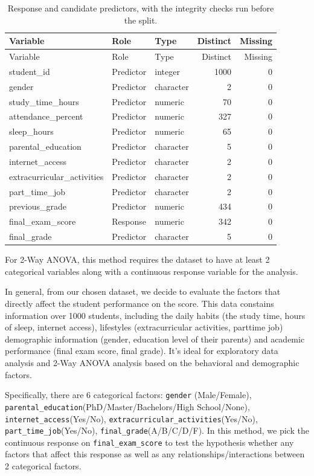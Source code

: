 \documentclass[
  11pt,
]{article}
\begin{document}
\begin{longtable}[]{@{}lllrr@{}}
\caption{Response and candidate predictors, with the integrity checks
run before the split.}\tabularnewline
\toprule\noalign{}
Variable & Role & Type & Distinct & Missing \\
\midrule\noalign{}
\endfirsthead
\toprule\noalign{}
Variable & Role & Type & Distinct & Missing \\
\midrule\noalign{}
\endhead
\bottomrule\noalign{}
\endlastfoot
student\_id & Predictor & integer & 1000 & 0 \\
gender & Predictor & character & 2 & 0 \\
study\_time\_hours & Predictor & numeric & 70 & 0 \\
attendance\_percent & Predictor & numeric & 327 & 0 \\
sleep\_hours & Predictor & numeric & 65 & 0 \\
parental\_education & Predictor & character & 5 & 0 \\
internet\_access & Predictor & character & 2 & 0 \\
extracurricular\_activities & Predictor & character & 2 & 0 \\
part\_time\_job & Predictor & character & 2 & 0 \\
previous\_grade & Predictor & numeric & 434 & 0 \\
final\_exam\_score & Response & numeric & 342 & 0 \\
final\_grade & Predictor & character & 5 & 0 \\
\end{longtable}

For 2-Way ANOVA, this method requires the dataset to have at least 2
categorical variables along with a continuous response variable for the
analysis.

In general, from our chosen dataset, we decide to evaluate the factors
that directly affect the student performance on the score. This data
constains information over 1000 students, including the daily habits
(the study time, hours of sleep, internet access), lifestyles
(extracurricular activities, parttime job) demographic information
(gender, education level of their parents) and academic performance
(final exam score, final grade). It's ideal for exploratory data
analysis and 2-Way ANOVA analysis based on the behavioral and
demographic factors.

Specifically, there are 6 categorical factors: \texttt{gender}
(Male/Female), \texttt{parental\_education}(PhD/Master/Bachelors/High
School/None), \texttt{internet\_access}(Yes/No),
\texttt{extracurricular\_activities}(Yes/No),
\texttt{part\_time\_job}(Yes/No), \texttt{final\_grade}(A/B/C/D/F). In
this method, we pick the continuous response on
\texttt{final\_exam\_score} to test the hypothesis whether any factors
that affect this response as well as any relationships/interactions
between 2 categorical factors.
\end{document}
